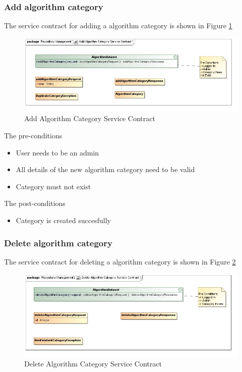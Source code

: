 \subsubsection {Add algorithm category}
The service contract for adding a algorithm category is shown in Figure \ref{fig:addAlgorithmCatService}
\begin{figure}[H]
  \begin{center}
  \includegraphics[scale=0.6]{../Diagrams and Charts/Test Data/Add Algorithm Category Service Contract.jpg}
  \caption{Add Algorithm Category Service Contract}
  \label{fig:addAlgorithmCatService}
  \end{center}
  
\end{figure}

The pre-conditions
\begin{itemize}
  \item User needs to be an admin
  \item All details of the new algorithm category need to be valid
  \item Category must not exist
\end{itemize}

The post-conditions
\begin{itemize}
  \item Category is created succesfully
\end{itemize}

\subsubsection {Delete algorithm category}

The service contract for deleting a algorithm category is shown in Figure \ref{fig:deleteAlgorithmCatService}
\begin{figure}[H]
  \begin{center}
  \includegraphics[scale=0.6]{../Diagrams and Charts/Test Data/Delete Algorithm Category Service Contract.jpg}
  \caption{Delete Algorithm Category Service Contract}
  \label{fig:deleteAlgorithmCatService}
  \end{center}
  
\end{figure}

